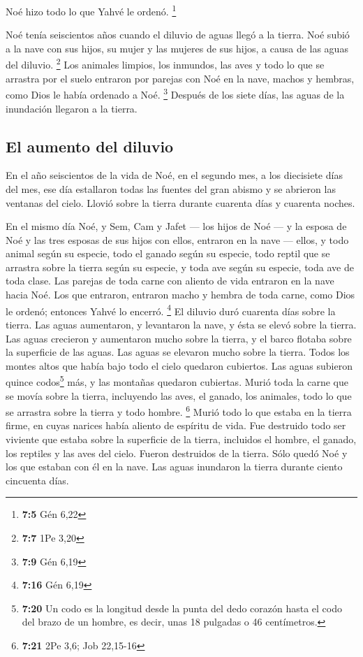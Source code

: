  Noé hizo todo lo que Yahvé le ordenó. \footnote{\textbf{7:5}
  Gén 6,22}

 Noé tenía seiscientos años cuando el diluvio de aguas
llegó a la tierra.  Noé subió a la nave con sus hijos, su
mujer y las mujeres de sus hijos, a causa de las aguas del diluvio.
\footnote{\textbf{7:7} 1Pe 3,20}  Los animales limpios,
los inmundos, las aves y todo lo que se arrastra por el suelo
 entraron por parejas con Noé en la nave, machos y
hembras, como Dios le había ordenado a Noé. \footnote{\textbf{7:9} Gén
  6,19}  Después de los siete días, las aguas de la
inundación llegaron a la tierra.

\hypertarget{el-aumento-del-diluvio}{%
\subsection{El aumento del diluvio}\label{el-aumento-del-diluvio}}

 En el año seiscientos de la vida de Noé, en el segundo
mes, a los diecisiete días del mes, ese día estallaron todas las fuentes
del gran abismo y se abrieron las ventanas del cielo. 
Llovió sobre la tierra durante cuarenta días y cuarenta noches.

 En el mismo día Noé, y Sem, Cam y Jafet --- los hijos de
Noé --- y la esposa de Noé y las tres esposas de sus hijos con ellos,
entraron en la nave ---  ellos, y todo animal según su
especie, todo el ganado según su especie, todo reptil que se arrastra
sobre la tierra según su especie, y toda ave según su especie, toda ave
de toda clase.  Las parejas de toda carne con aliento de
vida entraron en la nave hacia Noé.  Los que entraron,
entraron macho y hembra de toda carne, como Dios le ordenó; entonces
Yahvé lo encerró. \footnote{\textbf{7:16} Gén 6,19}  El
diluvio duró cuarenta días sobre la tierra. Las aguas aumentaron, y
levantaron la nave, y ésta se elevó sobre la tierra.  Las
aguas crecieron y aumentaron mucho sobre la tierra, y el barco flotaba
sobre la superficie de las aguas.  Las aguas se elevaron
mucho sobre la tierra. Todos los montes altos que había bajo todo el
cielo quedaron cubiertos.  Las aguas subieron quince
codos\footnote{\textbf{7:20} Un codo es la longitud desde la punta del
  dedo corazón hasta el codo del brazo de un hombre, es decir, unas 18
  pulgadas o 46 centímetros.} más, y las montañas quedaron cubiertas.
 Murió toda la carne que se movía sobre la tierra,
incluyendo las aves, el ganado, los animales, todo lo que se arrastra
sobre la tierra y todo hombre. \footnote{\textbf{7:21} 2Pe 3,6; Job
  22,15-16}  Murió todo lo que estaba en la tierra firme,
en cuyas narices había aliento de espíritu de vida.  Fue
destruido todo ser viviente que estaba sobre la superficie de la tierra,
incluidos el hombre, el ganado, los reptiles y las aves del cielo.
Fueron destruidos de la tierra. Sólo quedó Noé y los que estaban con él
en la nave.  Las aguas inundaron la tierra durante ciento
cincuenta días.

